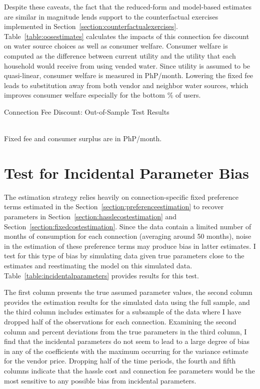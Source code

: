 \documentclass[12pt]{article}
\begin{document}
\begin{appendices}
Despite these caveats, the fact that the reduced-form and model-based estimates are similar in magnitude lends support to the counterfactual exercises implemented in Section~\ref{section:counterfactualexercises}.  Table~\ref{table:oosestimates} calculates the impacts of this connection fee discount on water source choices as well as consumer welfare.  Consumer welfare is computed as the difference between current utility and the utility that each household would receive from using vended water.  Since utility is assumed to be quasi-linear, consumer welfare is measured in PhP/month.  Lowering the fixed fee leads to substitution away from both vendor and neighbor water sources, which improves consumer welfare especially for the bottom \unskip\% of users.

\begin{table}
\centering
\caption{Connection Fee Discount: Out-of-Sample Test Results}\label{table:oosestimates}
 \\ 
\vspace{.2cm}
\footnotesize{Fixed fee and consumer surplus are in PhP/month.}
\end{table}




\section{Test for Incidental Parameter Bias}\label{appendix:incidentalparametertest}

The estimation strategy relies heavily on connection-specific fixed preference terms estimated in the Section~\ref{section:preferenceestimation} to recover parameters in Section~\ref{section:hasslecostestimation} and Section~\ref{section:fixedcostestimation}.  Since the data contain a limited number of months of consumption for each connection (averaging around 50 months), noise in the estimation of these preference terms may produce bias in latter estimates.  I test for this type of bias by simulating data given true parameters close to the estimates and reestimating the model on this simulated data.  Table~\ref{table:incidentalparameters} provides results for this test.  

The first column presents the true assumed parameter values, the second column provides the estimation results for the simulated data using the full sample, and the third column includes estimates for a subsample of the data where I have dropped half of the observations for each connection.  Examining the second column and percent deviations from the true parameters in the third column, I find that the incidental parameters do not seem to lead to a large degree of bias in any of the coefficients with the maximum occurring for the variance estimate for the vendor price.  Dropping half of the time periods, the fourth and fifth columns indicate that the hassle cost and connection fee parameters would be the most sensitive to any possible bias from incidental parameters.


\end{appendices}
\end{document}
